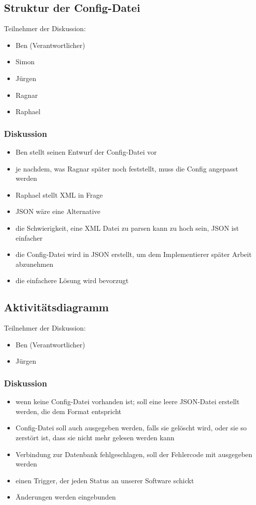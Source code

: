 \documentclass{scrartcl}
\begin{document}
\subsection{Struktur der Config-Datei}
Teilnehmer der Diskussion:
\begin{itemize}
	\item Ben (Verantwortlicher)
	\item Simon
	\item Jürgen
	\item Ragnar
	\item Raphael
\end{itemize}

\subsubsection*{Diskussion}
\begin{itemize}
	\item Ben stellt seinen Entwurf der Config-Datei vor
	\item je nachdem, was Ragnar später noch feststellt, muss die Config angepasst werden
	\item Raphael stellt XML in Frage
	\item JSON wäre eine Alternative
	\item die Schwierigkeit, eine XML Datei zu parsen kann zu hoch sein, JSON ist einfacher
	\item die Config-Datei wird in JSON erstellt, um dem Implementierer später Arbeit abzunehmen
	\item die einfachere Lösung wird bevorzugt
\end{itemize}


\subsection{Aktivitätsdiagramm}
Teilnehmer der Diskussion:
\begin{itemize}
	\item Ben (Verantwortlicher)
	\item Jürgen
\end{itemize}

\subsubsection*{Diskussion}
\begin{itemize}
	\item wenn keine Config-Datei vorhanden ist; soll eine leere JSON-Datei erstellt werden, die dem Format entspricht
	\item Config-Datei soll auch ausgegeben werden, falls sie gelöscht wird, oder sie so zerstört ist, dass sie nicht mehr gelesen werden kann
	\item Verbindung zur Datenbank fehlgeschlagen, soll der Fehlercode mit ausgegeben werden
	\item einen Trigger, der jeden Status an unserer Software schickt
	\item Änderungen werden eingebunden
\end{itemize}
\end{document}
